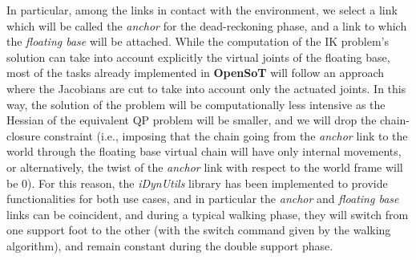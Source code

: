 In particular, among the links in contact with the environment, we select a link which will be called the  \emph{anchor} for the dead-reckoning phase, and a link to which the \emph{floating base} will be attached. While the computation of the IK problem's solution can take into account explicitly the virtual joints of the floating base, most of the tasks already implemented in \textbf{OpenSoT} will follow an approach where the Jacobians are cut to take into account only the actuated joints. In this way, the solution of the problem will be computationally less intensive as the Hessian of the equivalent QP problem will be smaller, and we will drop the chain-closure constraint (i.e., imposing that the chain going from the \emph{anchor} link to the world through the floating base virtual chain will have only internal movements, or alternatively, the twist of the \emph{anchor} link with respect to the world frame will be $0$). For this reason, the \emph{iDynUtils} library has been implemented to provide functionalities for both use cases, and in particular the \emph{anchor} and \emph{floating base} links can be coincident, and during a typical walking phase, they will switch from one support foot to the other (with the switch command given by the walking algorithm), and remain constant during the double support phase.

